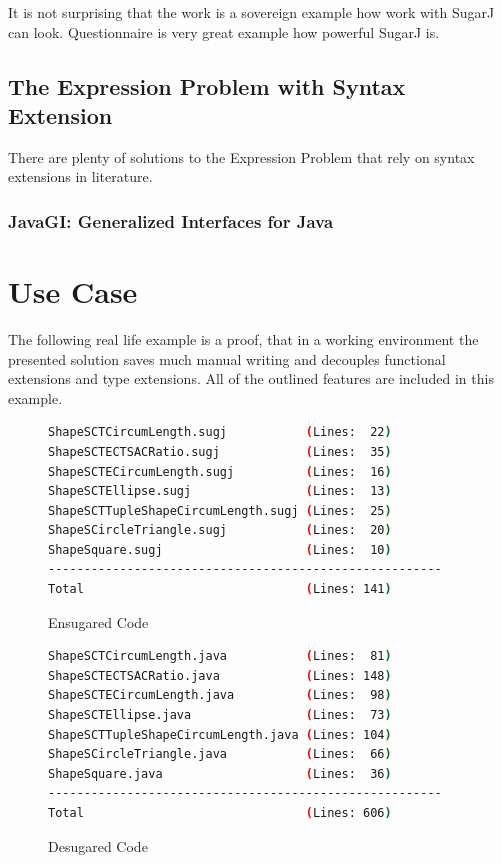 \documentclass{report}
\begin{document}
It is not surprising that the work is a sovereign example how work with SugarJ can look. Questionnaire is very great example how powerful SugarJ is.

\section{The Expression Problem with Syntax Extension}

There are plenty of solutions to the Expression Problem that rely on syntax extensions in literature.

\subsection{JavaGI: Generalized Interfaces for Java \cite{Wehr-JavaGI-2007}}

\chapter{Use Case}

The following real life example is a proof, that in a working environment the presented solution saves much manual writing and decouples functional extensions and type extensions. All of the outlined features are included in this example.

\begin{figure}[h]
\begin{lstlisting}[language=bash,numbers=none]
ShapeSCTCircumLength.sugj           (Lines:  22)
ShapeSCTECTSACRatio.sugj            (Lines:  35)
ShapeSCTECircumLength.sugj          (Lines:  16)
ShapeSCTEllipse.sugj                (Lines:  13)
ShapeSCTTupleShapeCircumLength.sugj (Lines:  25)
ShapeSCircleTriangle.sugj           (Lines:  20)
ShapeSquare.sugj                    (Lines:  10)
-------------------------------------------------------
Total                               (Lines: 141)
\end{lstlisting}
\caption{Ensugared Code}
\end{figure}

\begin{figure}[h]
\begin{lstlisting}[language=bash,numbers=none]
ShapeSCTCircumLength.java           (Lines:  81)
ShapeSCTECTSACRatio.java            (Lines: 148)
ShapeSCTECircumLength.java          (Lines:  98)
ShapeSCTEllipse.java                (Lines:  73)
ShapeSCTTupleShapeCircumLength.java (Lines: 104)
ShapeSCircleTriangle.java           (Lines:  66)
ShapeSquare.java                    (Lines:  36)
-------------------------------------------------------
Total                               (Lines: 606)
\end{lstlisting}
\caption{Desugared Code}
\end{figure}
\end{document}
